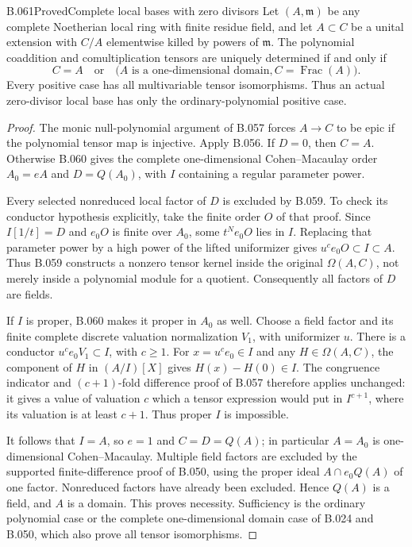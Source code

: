 \begin{saresult}{B.061}{Proved}{Complete local bases with zero divisors}
Let $(A,\mathfrak m)$ be any complete Noetherian
local ring with finite residue field, and let
$A\subset C$ be a unital extension with $C/A$
elementwise killed by powers of $\mathfrak m$.
The polynomial coaddition and comultiplication
tensors are uniquely determined if and only if
\[
 C=A\quad\text{or}\quad
 \bigl(A\text{ is a one-dimensional domain},
                         C=\operatorname{Frac}(A)\bigr).
                                                               \tag{B61.1}
\]
Every positive case has all multivariable tensor
isomorphisms. Thus an actual zero-divisor local
base has only the ordinary-polynomial positive case.
\end{saresult}
\begin{proof}
The monic null-polynomial argument of B.057
forces $A\to C$ to be epic if the polynomial
tensor map is injective. Apply B.056.
If $D=0$, then $C=A$. Otherwise B.060 gives
the complete one-dimensional Cohen--Macaulay
order $A_0=eA$ and $D=Q(A_0)$, with $I$
containing a regular parameter power.

Every selected nonreduced local factor of $D$
is excluded by B.059. To check its conductor
hypothesis explicitly, take the finite order
$O$ of that proof. Since $I[1/t]=D$ and
$e_0O$ is finite over $A_0$, some $t^Ne_0O$
lies in $I$. Replacing that parameter power
by a high power of the lifted uniformizer
gives $u^ce_0O\subset I\subset A$.
Thus B.059 constructs a nonzero tensor kernel
inside the original $\Omega(A,C)$, not merely
inside a polynomial module for a quotient.
Consequently all factors of $D$ are fields.

If $I$ is proper, B.060 makes it proper in
$A_0$ as well. Choose a field factor and its
finite complete discrete valuation normalization
$V_1$, with uniformizer $u$. There is a
conductor $u^ce_0V_1\subset I$, with $c\ge1$.
For $x=u^ce_0\in I$ and any $H\in\Omega(A,C)$,
the component of $H$ in $(A/I)[X]$ gives
$H(x)-H(0)\in I$. The congruence indicator
and $(c+1)$-fold difference proof of B.057
therefore applies unchanged: it gives a value
of valuation $c$ which a tensor expression
would put in $I^{c+1}$, where its valuation
is at least $c+1$. Thus proper $I$ is impossible.

It follows that $I=A$, so $e=1$ and
$C=D=Q(A)$; in particular $A=A_0$ is
one-dimensional Cohen--Macaulay. Multiple
field factors are excluded by the supported
finite-difference proof of B.050, using the
proper ideal $A\cap e_0Q(A)$ of one factor.
Nonreduced factors have already been excluded.
Hence $Q(A)$ is a field, and $A$ is a domain.
This proves necessity. Sufficiency is the
ordinary polynomial case or the complete
one-dimensional domain case of B.024 and
B.050, which also prove all tensor isomorphisms.
\end{proof}


